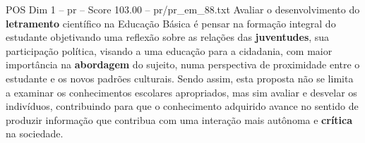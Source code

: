 \begin{textsample}{POS Dim 1 – pr – Score 103.00 – pr/pr\_em\_88.txt}
Avaliar o desenvolvimento do \textbf{letramento} científico na Educação Básica é pensar na formação integral do estudante objetivando uma reflexão sobre as relações das \textbf{juventudes}, sua participação política, visando a uma educação para a cidadania, com maior importância na \textbf{abordagem} do sujeito, numa perspectiva de proximidade entre o estudante e os novos padrões culturais.
Sendo assim, esta proposta não se limita a examinar os conhecimentos escolares apropriados, mas sim avaliar e desvelar os indivíduos, contribuindo para que o conhecimento adquirido avance no sentido de produzir informação que contribua com uma interação mais autônoma e \textbf{crítica} na sociedade.

\end{textsample}
